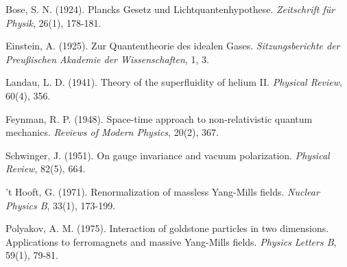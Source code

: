 \documentclass[12pt,a4paper]{article}
\begin{document}
\begin{thebibliography}{99}
Bose, S. N. (1924).
Plancks Gesetz und Lichtquantenhypothese.
\textit{Zeitschrift für Physik}, 26(1), 178-181.

Einstein, A. (1925).
Zur Quantentheorie des idealen Gases.
\textit{Sitzungsberichte der Preußischen Akademie der Wissenschaften}, 1, 3.

Landau, L. D. (1941).
Theory of the superfluidity of helium II.
\textit{Physical Review}, 60(4), 356.

Feynman, R. P. (1948).
Space-time approach to non-relativistic quantum mechanics.
\textit{Reviews of Modern Physics}, 20(2), 367.

Schwinger, J. (1951).
On gauge invariance and vacuum polarization.
\textit{Physical Review}, 82(5), 664.

't Hooft, G. (1971).
Renormalization of massless Yang-Mills fields.
\textit{Nuclear Physics B}, 33(1), 173-199.

Polyakov, A. M. (1975).
Interaction of goldstone particles in two dimensions. Applications to ferromagnets and massive Yang-Mills fields.
\textit{Physics Letters B}, 59(1), 79-81.

\end{thebibliography}
\end{document}
